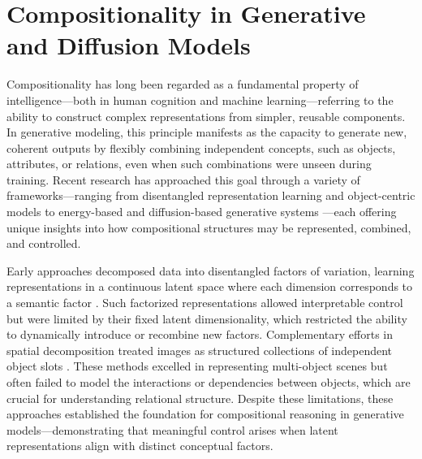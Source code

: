\section{Compositionality in Generative and Diffusion Models}
\label{sec:compositionality_models}

Compositionality has long been regarded as a fundamental property of intelligence—both in human cognition and machine learning—referring to the ability to construct complex representations from simpler, reusable components.  
In generative modeling, this principle manifests as the capacity to generate new, coherent outputs by flexibly combining independent concepts, such as objects, attributes, or relations, even when such combinations were unseen during training.  
Recent research has approached this goal through a variety of frameworks—ranging from disentangled representation learning \citep{wang2024disentangled} and object-centric models \citep{majellaro2024explicitly} to energy-based \citep{song2021train} and diffusion-based generative systems \citep{NEURIPS2020_4c5bcfec}—each offering unique insights into how compositional structures may be represented, combined, and controlled.

Early approaches decomposed data into disentangled factors of variation, learning representations in a continuous latent space where each dimension corresponds to a semantic factor \citep{higgins2017scan,generative_models_visually_grounded_imagination_2018}.  
Such factorized representations allowed interpretable control but were limited by their fixed latent dimensionality, which restricted the ability to dynamically introduce or recombine new factors.  
Complementary efforts in spatial decomposition treated images as structured collections of independent object slots \citep{steenkiste2019a,multi_object_representation_learning_iterative_variational_inference_2019}.  
These methods excelled in representing multi-object scenes but often failed to model the interactions or dependencies between objects, which are crucial for understanding relational structure.  
Despite these limitations, these approaches established the foundation for compositional reasoning in generative models—demonstrating that meaningful control arises when latent representations align with distinct conceptual factors.

